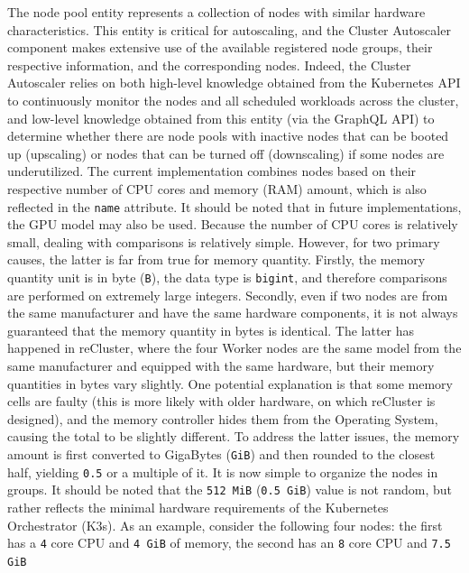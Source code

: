 The node pool entity represents a collection of nodes with similar hardware characteristics.
\newline
This entity is critical for autoscaling, and the Cluster Autoscaler component makes
extensive use of the available registered node groups, their respective
information, and the corresponding nodes. Indeed, the Cluster Autoscaler relies on
both high-level knowledge obtained from the Kubernetes API to continuously monitor
the nodes and all scheduled workloads across the cluster, and low-level
knowledge obtained from this entity (via the GraphQL API) to determine whether
there are node pools with inactive nodes that can be booted up (upscaling) or
nodes that can be turned off (downscaling) if some nodes are underutilized.
\newline
The current implementation combines nodes based on their respective number of CPU
cores and memory (RAM) amount, which is also reflected in the \texttt{name} attribute.
It should be noted that in future implementations, the GPU model may also be used.
Because the number of CPU cores is relatively small, dealing with comparisons is
relatively simple. However, for two primary causes, the latter is far from true
for memory quantity. Firstly, the memory quantity unit is in byte (\texttt{B}),
the data type is \texttt{bigint}, and therefore comparisons are performed on
extremely large integers. Secondly, even if two nodes are from the same
manufacturer and have the same hardware components, it is not always guaranteed that
the memory quantity in bytes is identical. The latter has happened in reCluster,
where the four Worker nodes are the same model from the same manufacturer and equipped
with the same hardware, but their memory quantities in bytes vary slightly. One potential
explanation is that some memory cells are faulty (this is more likely with older
hardware, on which reCluster is designed), and the memory controller hides them from
the Operating System, causing the total to be slightly different. To address the
latter issues, the memory amount is first converted to GigaBytes (\texttt{GiB}) and
then rounded to the closest half, yielding \texttt{0.5} or a multiple of it. It
is now simple to organize the nodes in groups. It should be noted that the \texttt{512
MiB} (\texttt{0.5 GiB}) value is not random, but rather reflects the minimal
hardware requirements of the Kubernetes Orchestrator (K3s). As an example,
consider the following four nodes: the first has a \texttt{4} core CPU and
\texttt{4 GiB} of memory, the second has an \texttt{8} core CPU and \texttt{7.5 GiB}
